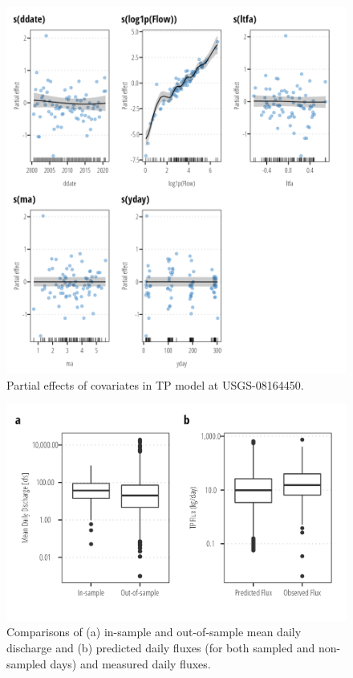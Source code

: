 \documentclass[
]{article}
\begin{document}
\begin{figure}[h]

{\centering \includegraphics{model_assessment_files/figure-pdf/unnamed-chunk-35-1.png}

}

\caption{Partial effects of covariates in TP model at USGS-08164450.}

\end{figure}

\begin{figure}[h]

{\centering \includegraphics{model_assessment_files/figure-pdf/unnamed-chunk-36-1.png}

}

\caption{Comparisons of (a) in-sample and out-of-sample mean daily
discharge and (b) predicted daily fluxes (for both sampled and
non-sampled days) and measured daily fluxes.}

\end{figure}
\end{document}
